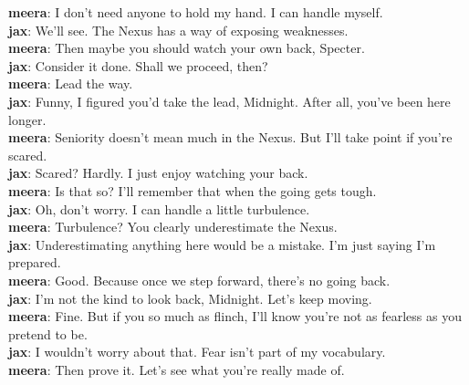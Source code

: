 \documentclass[12pt]{book}
\begin{document}
\textbf{meera}: I don't need anyone to hold my hand. I can handle myself.\\

\textbf{jax}: We'll see. The Nexus has a way of exposing weaknesses.\\

\textbf{meera}: Then maybe you should watch your own back, Specter.\\

\textbf{jax}: Consider it done. Shall we proceed, then?\\

\textbf{meera}: Lead the way.\\

\textbf{jax}: Funny, I figured you'd take the lead, Midnight. After all, you've been here longer.\\

\textbf{meera}: Seniority doesn't mean much in the Nexus. But I'll take point if you're scared.\\

\textbf{jax}: Scared? Hardly. I just enjoy watching your back.\\

\textbf{meera}: Is that so? I'll remember that when the going gets tough.\\

\textbf{jax}: Oh, don't worry. I can handle a little turbulence.\\

\textbf{meera}: Turbulence? You clearly underestimate the Nexus.\\

\textbf{jax}: Underestimating anything here would be a mistake. I'm just saying I'm prepared.\\

\textbf{meera}: Good. Because once we step forward, there's no going back.\\

\textbf{jax}: I'm not the kind to look back, Midnight. Let's keep moving.\\

\textbf{meera}: Fine. But if you so much as flinch, I'll know you're not as fearless as you pretend to be.\\

\textbf{jax}: I wouldn't worry about that. Fear isn't part of my vocabulary.\\

\textbf{meera}: Then prove it. Let's see what you're really made of.\\
\end{document}
